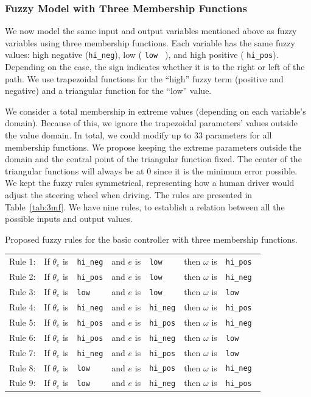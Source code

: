 \documentclass[symmetry,article,submit,moreauthors,pdftex]{Definitions/mdpi}
\begin{document}
\subsubsection{Fuzzy Model with Three Membership Functions}

We now model the same input and output variables mentioned above as fuzzy
variables using three membership functions. Each variable has the same fuzzy
values: high negative ({\tt hi\_neg}), low ({ \tt  low } ), and high positive
({ \tt hi\_pos}). Depending on the case, the sign indicates whether it is to
the right or left of the path. We use trapezoidal functions for the ``high''
fuzzy term (positive and negative) and a triangular function for the ``low''
value.

We consider a total membership in extreme values (depending on each variable's
domain). Because of this, we ignore the trapezoidal parameters' values outside
the value domain. In total, we could modify up to 33 parameters for all
membership functions. We propose keeping the extreme parameters outside the
domain and the central point of the triangular function fixed. The center of
the triangular functions will always be at 0 since it is the minimum error
possible.  We kept the fuzzy rules symmetrical, representing how a human driver
would adjust the steering wheel when driving. The rules are presented in Table~\ref{tab:3mf}.
We have nine rules, to establish a relation between all the
possible inputs and output values.

\begin{specialtable}[H]
    \caption{Proposed fuzzy rules for the basic controller with three membership functions.}\label{tab:3mf}
    \centering
    \begin{tabular}{lllllll}
    Rule 1: & If $\theta_e$ is & { \tt hi\_neg} & and $e$ is & {\tt low}     & then $\omega$  is & {\tt hi\_pos}     \\
    Rule 2: & If $\theta_e$ is  & { \tt hi\_pos} & and $e$ is & {\tt low}     & then $\omega$ is & {\tt hi\_neg }    \\
    Rule 3: & If $\theta_e$ is & { \tt  low }     & and $e$ is & {\tt low}     & then $\omega$ is &{\tt low}         \\
    Rule 4: & If $\theta_e$ is & { \tt hi\_neg} & and $e$ is & {\tt hi\_neg} & then $\omega$ is &{\tt hi\_pos}     \\
    Rule 5: & If $\theta_e$ is & { \tt hi\_pos} & and $e$ is & {\tt hi\_pos} & then $\omega$ is &{\tt hi\_neg }    \\
    Rule 6: & If $\theta_e$ is & { \tt hi\_pos} & and $e$ is & {\tt hi\_neg} & then $\omega$ is &{\tt low   }      \\
    Rule 7: & If $\theta_e$ is & { \tt hi\_neg} & and $e$ is & {\tt hi\_pos} & then $\omega$ is & {\tt low   }      \\
    Rule 8: & If $\theta_e$ is & { \tt low }    & and $e$ is & {\tt hi\_pos} & then $\omega$ is & {\tt hi\_neg }    \\
    Rule 9: & If $\theta_e$ is & { \tt low}     & and $e$ is & {\tt hi\_neg} & then $\omega$ is & {\tt hi\_pos }
    \end{tabular}
 \end{specialtable}
\end{document}
